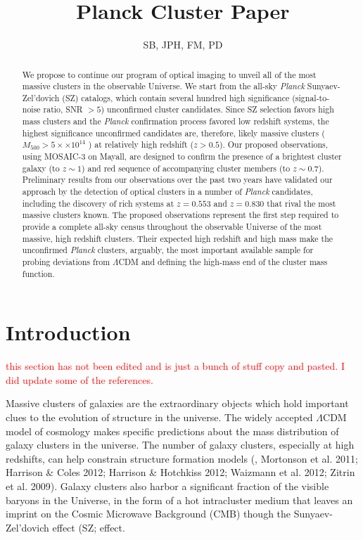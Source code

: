 \documentclass[apj, revtex4-1]{emulateapj}
\newcommand{\editorial}[1]{\textcolor{red}{#1}}
\begin{document}
\title{Planck Cluster Paper}

\author{\sc SB, JPH, FM, PD}



\begin{abstract}
	\noindent We propose to continue our program of optical imaging to unveil all of the most massive clusters in
	the observable Universe. We start from the all-sky \textit{Planck} Sunyaev-Zel’dovich (SZ) catalogs, which contain several hundred high significance (signal-to-noise ratio, SNR $> 5$) unconfirmed cluster candidates. Since SZ selection favors high mass clusters and the \textit{Planck} confirmation process favored	low redshift systems, the highest significance unconfirmed candidates are, therefore, likely massive clusters ($M_{500} > 5 ×\times 10^{14}$ \Msol) at relatively high redshift ($z > 0.5$). Our proposed observations,	using MOSAIC-3 on Mayall, are designed to confirm the presence of a brightest cluster galaxy (to $z \sim 1$) and red sequence of accompanying cluster members (to $z \sim 0.7$). Preliminary results from our observations over the past two years have validated our approach by the detection of optical clusters in a number of \textit{Planck} candidates, including the discovery of rich systems at $z = 0.553$ and $z = 0.830$ that rival the most massive clusters known. The proposed observations represent the first step required to provide a complete all-sky census throughout the observable Universe of the most massive, high redshift clusters. Their expected high redshift and high mass make the unconfirmed \textit{Planck} clusters, arguably, the most important available sample for probing deviations from $\Lambda$CDM and defining the high-mass end of the cluster mass function.
\end{abstract}

\section{Introduction}
\editorial{this section has not been edited and is just a bunch of stuff copy and pasted. I did update some of the references.}

Massive clusters of galaxies are the extraordinary objects which hold important clues to the evolution of structure in the universe. The widely accepted $\Lambda$CDM model of cosmology makes specific predictions about the mass distribution of galaxy clusters in the universe. The number of galaxy clusters, especially at high redshifts, can help constrain structure formation models (\eg, Mortonson et al. 2011; Harrison \& Coles 2012; Harrison \& Hotchkiss 2012; Waizmann et al. 2012; Zitrin et al. 2009). Galaxy clusters also harbor a significant fraction of the visible baryons in the Universe, in the form of a hot intracluster medium that leaves an imprint on the Cosmic Microwave Background (CMB) though the Sunyaev-Zel'dovich effect (SZ; \citealt{Sunyaev1972} effect.
\end{document}
